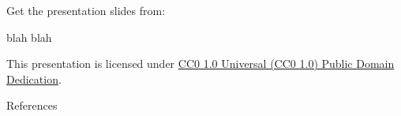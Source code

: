 \begin{frame}[c]

  Get the presentation slides from:

  \begin{center}blah blah\end{center}

  This presentation is licensed under
    \href{https://creativecommons.org/publicdomain/zero/1.0/}{
    CC0 1.0 Universal (CC0 1.0) Public Domain Dedication}.

  \begin{center}\cczero\end{center}

\end{frame}

\begin{frame}[allowframebreaks]{References}
  \printbibliography[heading=none]
\end{frame}



